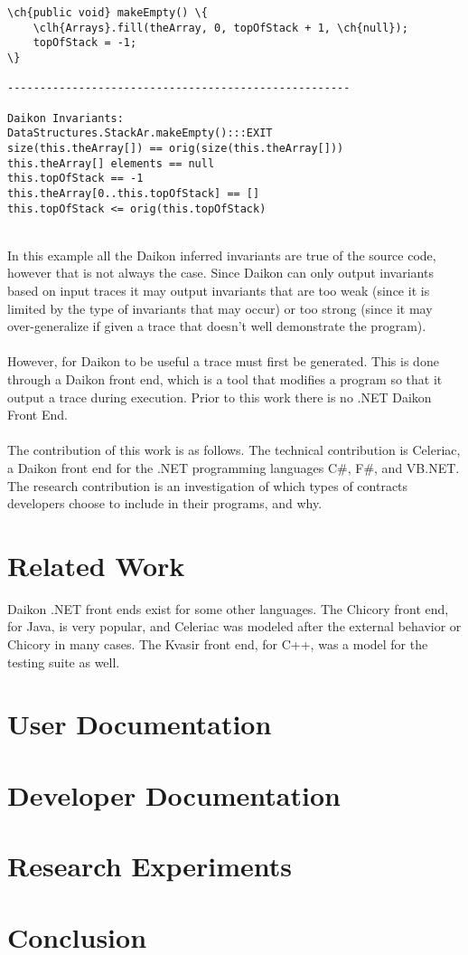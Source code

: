 \documentclass{article}
\newcommand\ch[1]{\textcolor[rgb]{0,0,1}{\textbf{#1}}}
\newcommand\clh[1]{\textcolor[rgb]{0,.5,1}{\textbf{#1}}}
\begin{document}
\begin{center}
\begin{Verbatim}[commandchars=\\\{\}]
\ch{public void} makeEmpty() \{
    \clh{Arrays}.fill(theArray, 0, topOfStack + 1, \ch{null});
    topOfStack = -1;
\}

-----------------------------------------------------

Daikon Invariants:
DataStructures.StackAr.makeEmpty():::EXIT
size(this.theArray[]) == orig(size(this.theArray[]))
this.theArray[] elements == null
this.topOfStack == -1
this.theArray[0..this.topOfStack] == []
this.topOfStack <= orig(this.topOfStack)

\end{Verbatim}
\end{center} 
\  \\
In this example all the Daikon inferred invariants are true of the source code, however that is not always the case. Since Daikon can only output invariants based on input traces it may output invariants that are too weak (since it is limited by the type of invariants that may occur) or too strong (since it may over-generalize if given a trace that doesn't well demonstrate the program).
\\ \\
However, for Daikon to be useful a trace must first be generated. This is done through a Daikon front end, which is a tool that modifies a program so that it output a trace during execution. Prior to this work there is no .NET Daikon Front End.
\\ \\
The contribution of this work is as follows. The technical contribution is Celeriac, a Daikon front end for the .NET programming languages C\#, F\#, and VB.NET. The research contribution is an investigation of which types of contracts developers choose to include in their programs, and why.

\section{Related Work}
Daikon .NET front ends exist for some other languages. The Chicory front end, for Java, is very popular, and Celeriac was modeled after the external behavior or Chicory in many cases. The Kvasir front end, for C++, was a model for the testing suite as well.

\section{User Documentation}
\section{Developer Documentation}
\section{Research Experiments}
\section{Conclusion}

\newpage


\end{document}
